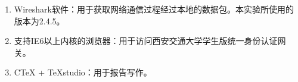 \begin{enumerate}
	\item Wireshark软件：用于获取网络通信过程经过本地的数据包。本实验所使用的版本为2.4.5。
	\item 支持IE6以上内核的浏览器：用于访问西安交通大学学生版统一身份认证网关。
	\item CTeX + TeXstudio：用于报告写作。
\end{enumerate}